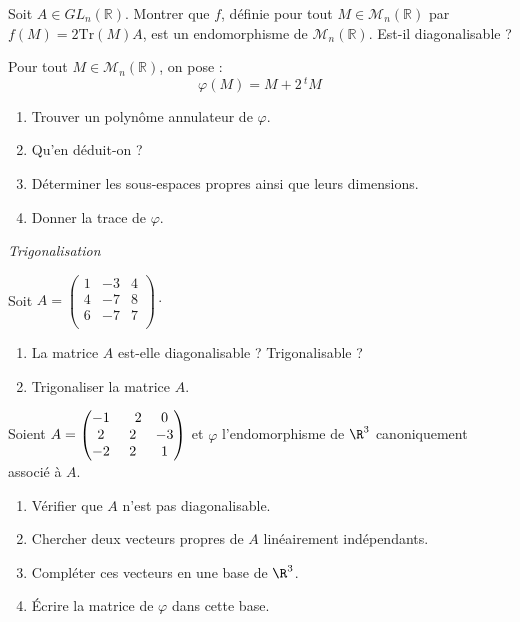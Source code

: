 \documentclass[a4paper,10pt]{report}
\begin{document}
\begin{Exa} Soit $A \in GL_n(\mathbb{R})$. Montrer que $f$, définie pour tout $M \in \mathcal{M}_n(\mathbb{R})$ par $f(M)= 2 \textrm{Tr}(M) A$, est un endomorphisme de $\mathcal{M}_n(\mathbb{R})$. Est-il diagonalisable ?
\end{Exa}


\begin{Exa}  Pour tout $M \in \mathcal{M}_n(\mathbb{R})$, on pose :
$$ \varphi(M) = M +2 \, {}^t M$$
\begin{enumerate}
\item Trouver un polynôme annulateur de $\varphi$.
\item Qu'en déduit-on ?
\item Déterminer les sous-espaces propres ainsi que leurs dimensions.
\item Donner la trace de $\varphi$.
\end{enumerate}
\end{Exa}



\medskip

\begin{center}
\textit{{ {\large Trigonalisation}}}
\end{center}

\medskip

\begin{Exa} Soit $A= \begin{pmatrix}
1 & -3 & 4 \\
4 & -7 & 8 \\
6 & -7 & 7 \\
\end{pmatrix}\cdot$

\begin{enumerate}
\item La matrice $A$ est-elle diagonalisable ? Trigonalisable ?
\item Trigonaliser la matrice $A$. 
\end{enumerate}
\end{Exa}


\begin{Exa} Soient $A = \begin{pmatrix} -1 &\phantom-2 & 0 \cr 2 &2 &-3 \cr -2 &2 &1 \cr \end{pmatrix}$ et $\varphi$ l'endomorphisme de $\R^3$ canoniquement associé à $A$.

\begin{enumerate}
  \item Vérifier que $A$ n'est pas diagonalisable.
    
  \item Chercher deux vecteurs propres de $A$ linéairement indépendants.
    
  \item Compléter ces vecteurs en une base de $\R^3$.
    
  \item \'Ecrire la matrice de $\varphi$ dans cette base.
        
\end{enumerate}
\end{Exa} 
\end{document}
